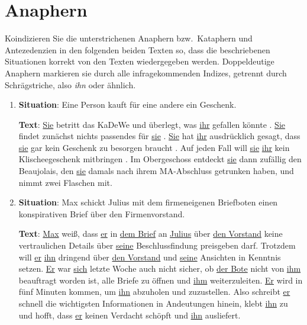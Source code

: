 \newpage

\section{Anaphern}

Koindizieren Sie die unterstrichenen Anaphern bzw.\ Kataphern und Antezedenzien in den folgenden beiden Texten so, dass die beschriebenen Situationen korrekt von den Texten wiedergegeben werden.
Doppeldeutige Anaphern markieren sie durch alle infragekommenden Indizes, getrennt durch Schrägstriche, also \textit{ihn} oder ähnlich.

\begin{enumerate}
  \item\doublespacing%
    \begin{spread}
      \textbf{Situation}: Eine Person kauft für eine andere ein Geschenk.
      
      \textbf{Text}: \uline{Sie} betritt das KaDeWe und überlegt, was \uline{ihr} gefallen könnte .
      \uline{Sie} findet zunächst nichts passendes für \uline{sie} .
      \uline{Sie} hat \uline{ihr} ausdrücklich gesagt, dass \uline{sie} gar kein Geschenk zu besorgen braucht .
      Auf jeden Fall will \uline{sie} \uline{ihr} kein Klischeegeschenk mitbringen .
      Im Obergeschoss entdeckt \uline{sie} dann zufällig den Beaujolais, den \uline{sie} damals nach ihrem MA-Abschluss getrunken haben, und nimmt zwei Flaschen mit.\end{spread}
    \Zeile
  \item\doublespacing
    \begin{spread}
      \textbf{Situation}: Max schickt Julius mit dem firmeneigenen Briefboten einen konspirativen Brief über den Firmenvorstand.

      \textbf{Text}: \uline{Max} weiß, dass \uline{er} in \uline{dem Brief} an \uline{Julius} über \uline{den Vorstand} keine vertraulichen Details über \uline{seine} Beschlussfindung preisgeben darf.
      Trotzdem will \uline{er} \uline{ihn} dringend über \uline{den Vorstand} und \uline{seine} Ansichten in Kenntnis setzen.
      \uline{Er} war \uline{sich} letzte Woche auch nicht sicher, ob \uline{der Bote} nicht von \uline{ihm} beauftragt worden ist, alle Briefe zu öffnen und \uline{ihm} weiterzuleiten.
      \uline{Er} wird in fünf Minuten kommen, um \uline{ihn} abzuholen und zuzustellen.
      Also schreibt \uline{er} schnell die wichtigsten Informationen in Andeutungen hinein, klebt \uline{ihn} zu und hofft, dass \uline{er} keinen Verdacht schöpft und \uline{ihn} ausliefert.
  \end{spread}
\end{enumerate}

